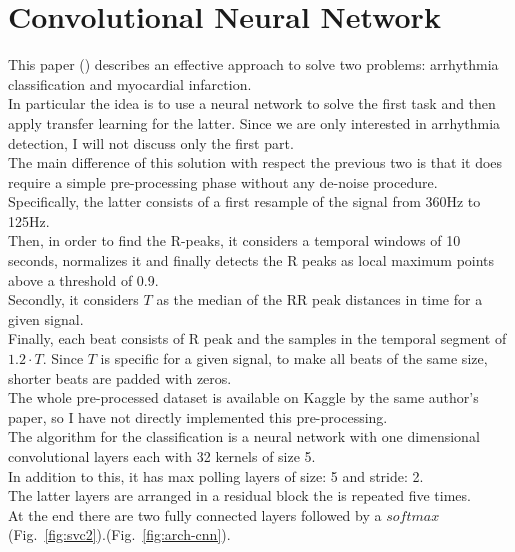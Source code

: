 \documentclass[LaM,binding=0.6cm]{sapthesis}
\begin{document}
\section{Convolutional Neural Network  \cite{cnnfazeli}}
This paper (\cite{cnnfazeli}) describes an effective approach to solve two problems: arrhythmia classification and myocardial infarction.\\In particular the idea is to use a neural network to solve the first task and then apply transfer learning for the latter. Since we are only interested in arrhythmia detection, I will not discuss only the first part.\\The main difference of this solution with respect the previous two is that it does require a simple pre-processing phase without any de-noise procedure.\\Specifically, the latter consists of a first resample of the signal from 360Hz to 125Hz.\\Then, in order to find the R-peaks, it considers a temporal windows of 10 seconds, normalizes it and finally detects the R peaks as local maximum points above a threshold of 0.9.\\Secondly, it considers $T$ as the median of the RR peak distances in time for a given signal.\\Finally, each beat consists of R peak and the samples in the temporal segment of $1.2 \cdot T$. Since $T$ is specific for a given signal, to make all beats of the same size, shorter beats are padded with zeros.\\The whole pre-processed dataset is available on Kaggle by the same author's paper, so I have not directly implemented this pre-processing.\\The algorithm for the classification is a neural network with one dimensional convolutional layers each with 32 kernels of size 5.\\In addition to this, it has max polling layers of size: 5 and stride: 2.\\The latter layers are arranged in a residual block the is repeated five times.\\At the end there are two fully connected layers followed by a $softmax$ (Fig.~\ref{fig:svc2}).(Fig.~\ref{fig:arch-cnn}).
\end{document}
